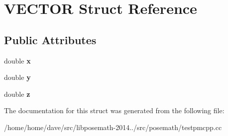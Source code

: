\hypertarget{structVECTOR}{}\section{V\+E\+C\+T\+O\+R Struct Reference}
\label{structVECTOR}
\subsection*{Public Attributes}
\begin{DoxyCompactItemize}
\item 
\hypertarget{structVECTOR_a3d2ce826d744d2ddeb45f0b8e8b0cf63}{}double {\bfseries x}\label{structVECTOR_a3d2ce826d744d2ddeb45f0b8e8b0cf63}

\item 
\hypertarget{structVECTOR_a8aed039b215526167c1e96132d9a4101}{}double {\bfseries y}\label{structVECTOR_a8aed039b215526167c1e96132d9a4101}

\item 
\hypertarget{structVECTOR_ad848a8f4b993fec31f80e374ec7a154b}{}double {\bfseries z}\label{structVECTOR_ad848a8f4b993fec31f80e374ec7a154b}

\end{DoxyCompactItemize}


The documentation for this struct was generated from the following file\+:\begin{DoxyCompactItemize}
\item 
/home/home/dave/src/libposemath-\/2014../src/posemath/testpmcpp.\+cc\end{DoxyCompactItemize}
